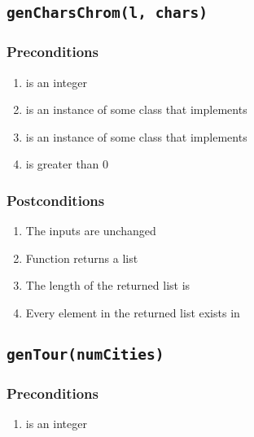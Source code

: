 \documentclass[letterpaper,10pt,english]{sphinxmanual}
\begin{document}
\subsection{\texttt{genCharsChrom(l, chars)}}
\label{contracts:gencharschrom-l-chars}

\subsubsection{Preconditions}
\label{contracts:id19}\begin{enumerate}
\item {} 
 is an integer

\item {} 
 is an instance of some class that implements 

\item {} 
 is an instance of some class that implements 

\item {} 
 is greater than 0

\end{enumerate}


\subsubsection{Postconditions}
\label{contracts:id20}\begin{enumerate}
\item {} 
The inputs are unchanged

\item {} 
Function returns a list

\item {} 
The length of the returned list is 

\item {} 
Every element in the returned list exists in 

\end{enumerate}


\subsection{\texttt{genTour(numCities)}}
\label{contracts:gentour-numcities}

\subsubsection{Preconditions}
\label{contracts:id21}\begin{enumerate}
\item {} 
 is an integer

\end{enumerate}
\end{document}
